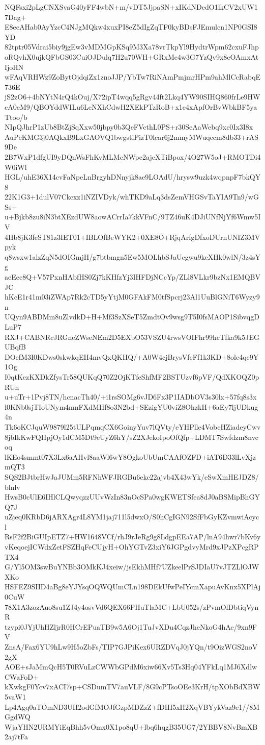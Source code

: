 NQFsxi2pLgCNXSvaG40yFF4wbN+m/vDT5JjpaSN+xIKdNDedO1lkCV2xUW17Dag+
E8ecAHab0AyYzcC4NJgMQkw4xuxPI8eZ5dIgZqTF0kyBDsFJEmulcn1NP0GSI8YD
82tptr05Vdrai5biy9jgEw3vMDMGpKSq9M3Xa78vrTkpYl9HydtrWpm62cxuFJhp
oRQvhX0ujkQFbGS03CuiOJDulq7H2u70WH+GRxMe4w3G7YzQv9x8cOAmxAtIjoHN
wFAqVRHWz9ZoBytOjdqiZx1znoJJP/YbTw7RiNAmPmjmrHPm9ahMlCcRabqE736E
jS2zO6+4bNYtN4rQ4kOuj/X72ipT4wqq5gRgv44ft2Lkq4YW90SIHQ860frLe9HW
cA0eM9/QBOYddWILu6LeNXhCdwH2XEkPTzRoB+x1e4xApfOrBvWbkBF5yaTtoo/b
NIpQJhrP1zUb8BtZjSqXxw50jbpy0b3QeFVcthL0PS+r30SeAaWebq9xc0Ix3I8x
AuPcKMG3j0AQkxB9LxGAOVQ1bwgstiPizT0lcar6j2mmyMWuqccm8db33+rAS9De
2B7WxP1dfgUI9yDQnWsFhKvMLMcNWpc2ajeXTiBpox/4O27W5oJ+RMOTDi4W0iWl
HGL/uhE36X14cvFaNpeLnBrgyhDNnyjk8ae9LOAdU/hrysw9uzk4wqpnpF7bkQY8
22K1G3+1dulV07Ckcxz1iNZIVDyk/whTKD9aLq3dsZemVHGSvTaYIA9Tn9/wGSs+
u+Bjkb8zu8iN3btXEzdUW8aowACrrIa7kkVFnC/9TZ46uK4DJiUNfNjYf6Wmw5IV
4Hb8jK3fcST81z3IET01+IBLOfBeWYK2+0XE8O+RjqArfgDfxoDUrnUNIZ3MVpyk
q8wsxw1alzZqN5dOIGmjH/g7btbmgn5Ew5MOLhbSJaUcgwu9keXHk0wlN/3z4sYg
aeEec8Q+V57PxnHAbfHS0Zj7kKHfzYj3IHFDjNCcYp/ZLl8VLkr9bzNx1EMQBVJC
hKcE1r41m03iZWAp7Rk2cTD5yYtjM0GFAkFM0tfSpcrj23Al1UuBlGNiT6Wyzy9n
UQyn9ABDMm8uZlvdkD+H+Mf3SzXSeT5ZmdtOv9wsg9T5I0fsMAOP1SibvqgDLuP7
RXJ+CABNRcJRGneZWseNEm2D5EXbO53VSZU4rwsVOIFhr99hcTfka9k5JEGUBqfB
DOefM3I0KDws0skwkqEH4mvQxQKHQ/+A0W4cjBrysVfcFf1k3KD+8ole4qe9Y1Og
I0qtKezKXDkZfysTr58QUKqQ70Z2OjKTfeShfMF2BSTUzvf6pVF/QdXKOQZ0pRUn
u+uTr+1Pvj8TN/hcnacTh40/+i1rsSOMg6vJD6Fx3P1IADbOV3s30lx+57fq8s3x
l0KNb0sjTIoUNym4mnFXdMHf8o3N2bd+SEzigYU0viZ8OhzkH+6aEy7ljUDkug4n
Tk6oKCJquW9879l25tULPqmqCX6GoinyYuv7lQVty/eYHPlle4VobcHZiadeyCwv
8jbIkKwFQHpjOy1dCM5Dt9eUyZ6hY/sZ2XJekoIpoOfQfp+LDMT7Swfdzm8nvcoq
lKEo4smmt07X3Lx6aAHvl8aaWl6wY8OgkoUbUmCAAfOZFD+iAT6D33lLvXjzmQT3
SQS2BJtbrHwJaJUMm5RFNhWFJRGBu6ekc22ajvb4X43wYk/eSwXmHEJDZ8/blnlv
HwsB0cUlE6IHlCLQwyqzzUUvWzIn83nOcSPa0wgKWETSfea8dJ0aBSMipBhGYQ7J
uZjeq0KRbD6jARXAgr4L8YM1jaj711l5dwxO/S0hCgIGN92SfFbGyKZvmwiAcycl
RsF2f2BiGUIpETZ7+HW1648VCf/rhJ9rJeRg9g8LdgpEEa7AP/lnA94hwr7bKv6y
vKeqoejICWdxZetFSZHqFeCUjyH+OhYGTvZ3xiY6JGPgdvyMrd9xJPzXPcgRPTX4
G/Yl5OM3swBuYNBb3OMkKJ4xeiw/jsEkhMHf7UZkeelPrSJDIaU7vJTZLlOJWXKo
HSFEZ9SIID4aBg8eYJYsqOQWQUmCLn198DEkUfwPeIYcmXapuAvKnx5XPlAj0CuW
78X1A3zozAuo8su1ZJ4y4osvVd6QEX66PHuTlaMC+LbU052s/zPvmOlDbtiqVynR
tzypi0JYjUhHZljrR0HCrEPuaTB9w5A6Oj1TuJvXDu4CqzJheNkoG4hAc/9xn9FV
ZnsA/Fax6YU9hLw9H5oZbFs/TIP7GJPiKex6URZDVqJ0jYQn/t9OizWGS2noV2gX
AOE+sJaMmQcH5T0RVuLzCWWbGPdM6xiw66Xv5Ts3Hq04YFkLq1MJ6XdlwCWaFoD+
kXwkgF0Ycv7xACI7sp+CSDumTV7auVLF/8G9cPTsoOEe3KrH/tpXObBdXBW5vaW1
Lp4Agq0aTOmND3UH2odGfMOJfGzpMDZzZ+fDIH5xH2XqVBYykVaz9e1//8MGgdWQ
WjaYHN2URMYiEqBhh5vOmx0X1po8qU+lbq6hqgB35UG7/2YBBV8NvBmXB2aj7tFa
